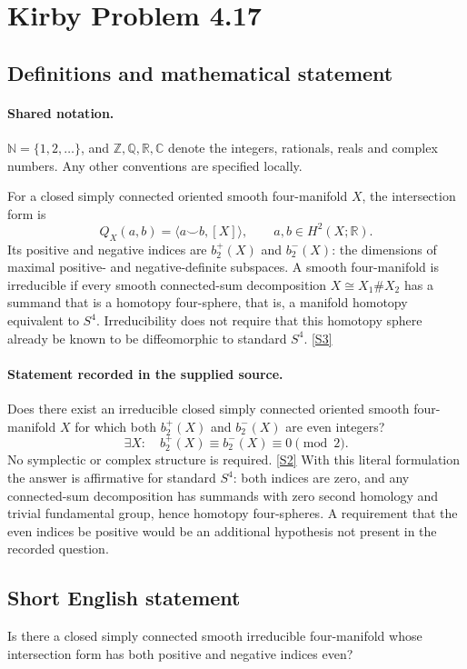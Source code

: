 \documentclass[11pt]{article}
\newcommand{\sref}[2]{\hyperlink{source:#1:#2}{[S#2]}}
\begin{document}
\section{Kirby Problem 4.17}\label{statement}

\subsection{Definitions and mathematical statement}

\paragraph{Shared notation.}$\mathbb N=\{1,2,\ldots\}$, and $\mathbb Z,\mathbb Q,\mathbb R,\mathbb C$ denote the integers, rationals, reals and complex numbers. Any other conventions are specified locally.


For a closed simply connected oriented smooth four-manifold $X$, the intersection form is
\[
Q_X(a,b)=\langle a\smile b,[X]\rangle,\qquad a,b\in H^2(X;\mathbb R).
\]
Its positive and negative indices are $b_2^+(X)$ and $b_2^-(X)$: the dimensions of maximal positive- and negative-definite subspaces. A smooth four-manifold is irreducible if every smooth connected-sum decomposition $X\cong X_1\#X_2$ has a summand that is a homotopy four-sphere, that is, a manifold homotopy equivalent to $S^4$. Irreducibility does not require that this homotopy sphere already be known to be diffeomorphic to standard $S^4$. \sref{statement}{3}
\paragraph{Statement recorded in the supplied source.}
Does there exist an irreducible closed simply connected oriented smooth four-manifold $X$ for which both $b_2^+(X)$ and $b_2^-(X)$ are even integers?
\[
\exists X:\quad b_2^+(X)\equiv b_2^-(X)\equiv0\pmod2.
\]
No symplectic or complex structure is required. \sref{statement}{2}
With this literal formulation the answer is affirmative for standard $S^4$: both indices are zero, and any connected-sum decomposition has summands with zero second homology and trivial fundamental group, hence homotopy four-spheres. A requirement that the even indices be positive would be an additional hypothesis not present in the recorded question.
\subsection{Short English statement}
Is there a closed simply connected smooth irreducible four-manifold whose intersection form has both positive and negative indices even?
\end{document}
